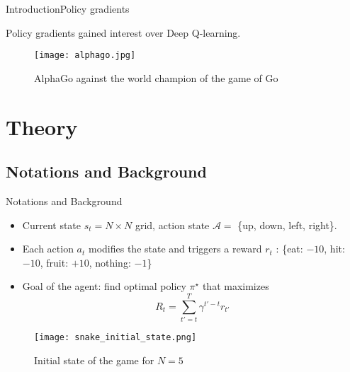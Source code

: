 \documentclass{beamer}
\begin{document}
\begin{frame}{Introduction}{Policy gradients}
  \begin{center}
    \Large Policy gradients gained interest over Deep Q-learning.
  \end{center}
  \begin{figure}[!htpb]
    \centering
    \texttt{[image: alphago.jpg]}
    \caption{AlphaGo against the world champion of the game of Go \cite{silver2016go}}
    \label{network}
  \end{figure}
\end{frame}


\section{Theory}

\subsection{Notations and Background}

\begin{frame}{Notations and Background}


\begin{itemize}
\item Current state $s_t = N \times N$ grid, action state $\mathcal A =$ \{up, down, left, right\}. 

\item Each action $a_t$ modifies the state and triggers a reward $r_t$ : \{{eat}: $-10$, {hit}: $-10$, {fruit}: $+10$, {nothing}: $-1$\} 

\item Goal of the agent: find optimal policy $\pi^{\star}$ that maximizes \[R_t = \sum_{t' = t}^T \gamma^{t' - t} r_{t'}\]


\end{itemize}

\begin{figure}[h]
\centering
\texttt{[image: snake\_initial\_state.png]}
\caption{Initial state of the game for $N = 5$}
\label{snake_init}
\end{figure}

\end{frame}
\end{document}
